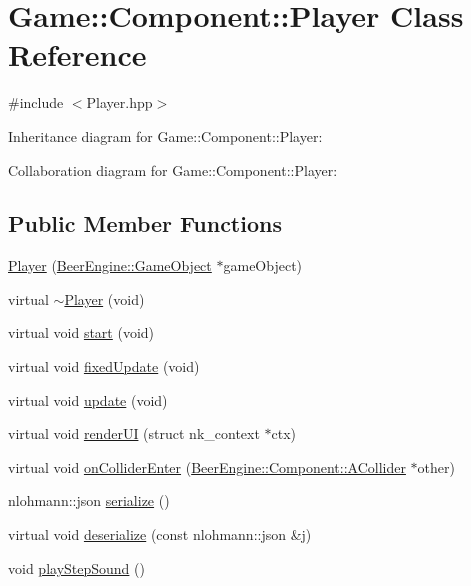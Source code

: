 \hypertarget{class_game_1_1_component_1_1_player}{}\section{Game\+:\+:Component\+:\+:Player Class Reference}
\label{class_game_1_1_component_1_1_player}


{\ttfamily \#include $<$Player.\+hpp$>$}



Inheritance diagram for Game\+:\+:Component\+:\+:Player\+:


Collaboration diagram for Game\+:\+:Component\+:\+:Player\+:
\subsection*{Public Member Functions}
\begin{DoxyCompactItemize}
\item 
\mbox{\hyperlink{class_game_1_1_component_1_1_player_a3568c25cf29f9931ed2c07208c98ee30}{Player}} (\mbox{\hyperlink{class_beer_engine_1_1_game_object}{Beer\+Engine\+::\+Game\+Object}} $\ast$game\+Object)
\item 
virtual \mbox{\hyperlink{class_game_1_1_component_1_1_player_ad2c9c1cfbbbd0187fb8df8f6d7e4010f}{$\sim$\+Player}} (void)
\item 
virtual void \mbox{\hyperlink{class_game_1_1_component_1_1_player_a317e5d073713ea27ceffe5de642240a6}{start}} (void)
\item 
virtual void \mbox{\hyperlink{class_game_1_1_component_1_1_player_aacbb2bc974b4b81434abd49eb8f91999}{fixed\+Update}} (void)
\item 
virtual void \mbox{\hyperlink{class_game_1_1_component_1_1_player_a52212c267395699de71b77e88b93032d}{update}} (void)
\item 
virtual void \mbox{\hyperlink{class_game_1_1_component_1_1_player_a5d5f837406a8e9f62dbe2c83ab3751b6}{render\+UI}} (struct nk\+\_\+context $\ast$ctx)
\item 
virtual void \mbox{\hyperlink{class_game_1_1_component_1_1_player_a68981bff23caf1fa65ea9a9007265b54}{on\+Collider\+Enter}} (\mbox{\hyperlink{class_beer_engine_1_1_component_1_1_a_collider}{Beer\+Engine\+::\+Component\+::\+A\+Collider}} $\ast$other)
\item 
nlohmann\+::json \mbox{\hyperlink{class_game_1_1_component_1_1_player_a164f1424c0ff3d603ee60301e0aee6a7}{serialize}} ()
\item 
virtual void \mbox{\hyperlink{class_game_1_1_component_1_1_player_a448003673bc03c81447887b9a6d38084}{deserialize}} (const nlohmann\+::json \&j)
\item 
void \mbox{\hyperlink{class_game_1_1_component_1_1_player_a87921f894ec75727bb1d83aa660573d1}{play\+Step\+Sound}} ()
\end{DoxyCompactItemize}
